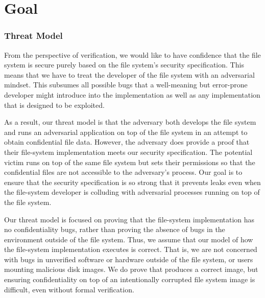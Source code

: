 \chapter{Goal}
\subsection{Threat Model}
From the perspective of verification, we would like to have confidence
that the file system is secure purely based on the file system's security
specification.  This means that we have to treat the developer of the
file system with an adversarial mindset.  This subsumes all possible
bugs that a well-meaning but error-prone developer might introduce into
the implementation as well as any implementation that is designed to be exploited.

As a result, our threat model is that the adversary both develops the
file system and runs an adversarial application on top of the file system
in an attempt to obtain confidential file data.  However, the adversary
does provide a proof that their file-system implementation meets our
security specification.  The potential victim runs on top of the same
file system but sets their permissions so that the confidential files
are not accessible to the adversary's process.  Our goal is to ensure
that the security specification is so strong that it prevents leaks even
when the file-system developer is colluding with adversarial processes
running on top of the file system.

Our threat model is focused on proving that the file-system implementation has
no confidentiality bugs, rather than proving the absence of bugs in the
environment outside of the file system. Thus, we assume that our model
of how the file-system implementation executes is correct.  That is, we are not
concerned with bugs in unverified software or hardware outside of the file
system, or users mounting malicious disk images.  We do prove that
 produces a correct image, but ensuring confidentiality on top of an
intentionally corrupted file system image is difficult, even without formal
verification. 





